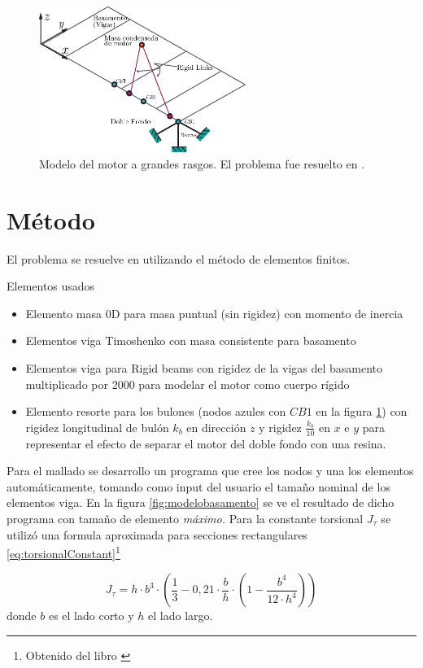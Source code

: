 \documentclass[onecolumn,10pt,titlepage,a4paper]{article}
\begin{document}
\begin{figure}[htb!]
	\centering
	\includegraphics[width=0.6\textwidth]{fig/modelomotor.eps}
	\caption{Modelo del motor a grandes rasgos. El problema fue resuelto en \Matlab.}
	\label{fig:modelomotor}
\end{figure}

\section{Método}
El problema se resuelve en \Matlab{} utilizando el método de elementos finitos.

Elementos usados
\begin{itemize}
	\item Elemento masa 0D para masa puntual (sin rigidez) con momento de inercia
	\item Elementos viga Timoshenko con masa consistente para basamento
	\item Elementos viga para Rigid beams con rigidez de la vigas del basamento multiplicado por 2000 para modelar el motor como cuerpo rígido
	\item Elemento resorte para los bulones (nodos azules con $CB1$ en la figura \ref{fig:modelomotor}) con rigidez longitudinal de bulón $k_b$ en dirección $z$ y rigidez $\frac{k_b}{10}$ en $x$ e $y$ para representar el efecto de separar el motor del doble fondo con una resina.
\end{itemize}

Para el mallado se desarrollo un programa que cree los nodos y una los elementos automáticamente, tomando como input del usuario el tamaño nominal de los elementos viga. En la figura \ref{fig:modelobasamento} se ve el resultado de dicho programa con tamaño de elemento \textit{máximo.} Para la constante torsional $J_\tau$ se utilizó una formula aproximada para secciones rectangulares \eqref{eq:torsionalConstant}\footnote{Obtenido del libro \cite{young2002roark}}

\begin{equation} \label{eq:torsionalConstant}
J_{\tau}=h \cdot b^{3} \cdot\left(\frac{1}{3}-0,21 \cdot \frac{b}{h} \cdot\left(1-\frac{b^{4}}{12 \cdot h^{4}}\right)\right)
\end{equation}
donde $b$ es el lado corto y $h$ el lado largo.
\end{document}
